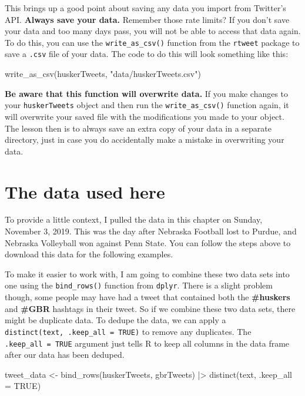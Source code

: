 \documentclass[
  letterpaper,
  DIV=11,
  numbers=noendperiod]{scrreprt}
\newenvironment{Shaded}{\begin{snugshade}}{\end{snugshade}}
\newcommand{\AttributeTok}[1]{\textcolor[rgb]{0.40,0.45,0.13}{#1}}
\newcommand{\ConstantTok}[1]{\textcolor[rgb]{0.56,0.35,0.01}{#1}}
\newcommand{\FunctionTok}[1]{\textcolor[rgb]{0.28,0.35,0.67}{#1}}
\newcommand{\NormalTok}[1]{\textcolor[rgb]{0.00,0.23,0.31}{#1}}
\newcommand{\OtherTok}[1]{\textcolor[rgb]{0.00,0.23,0.31}{#1}}
\newcommand{\SpecialCharTok}[1]{\textcolor[rgb]{0.37,0.37,0.37}{#1}}
\newcommand{\StringTok}[1]{\textcolor[rgb]{0.13,0.47,0.30}{#1}}
\begin{document}
This brings up a good point about saving any data you import from
Twitter's API. \textbf{Always save your data.} Remember those rate
limits? If you don't save your data and too many days pass, you will not
be able to access that data again. To do this, you can use the
\texttt{write\_as\_csv()} function from the \texttt{rtweet} package to
save a \texttt{.csv} file of your data. The code to do this will look
something like this:

\begin{Shaded}
\begin{Highlighting}[]
\FunctionTok{write\_as\_csv}\NormalTok{(huskerTweets, }\StringTok{"data/huskerTweets.csv"}\NormalTok{)}
\end{Highlighting}
\end{Shaded}

\textbf{Be aware that this function will overwrite data.} If you make
changes to your \texttt{huskerTweets} object and then run the
\texttt{write\_as\_csv()} function again, it will overwrite your saved
file with the modifications you made to your object. The lesson then is
to always save an extra copy of your data in a separate directory, just
in case you do accidentally make a mistake in overwriting your data.

\hypertarget{the-data-used-here}{%
\section{The data used here}\label{the-data-used-here}}

To provide a little context, I pulled the data in this chapter on
Sunday, November 3, 2019. This was the day after Nebraska Football lost
to Purdue, and Nebraska Volleyball won against Penn State. You can
follow the steps above to download this data for the following examples.

To make it easier to work with, I am going to combine these two data
sets into one using the \texttt{bind\_rows()} function from
\texttt{dplyr}. There is a slight problem though, some people may have
had a tweet that contained both the \textbf{\#huskers} and
\textbf{\#GBR} hashtags in their tweet. So if we combine these two data
sets, there might be duplicate data. To dedupe the data, we can apply a
\texttt{distinct(text,\ .keep\_all\ =\ TRUE)} to remove any duplicates.
The \texttt{.keep\_all\ =\ TRUE} argument just tells R to keep all
columns in the data frame after our data has been deduped.

\begin{Shaded}
\begin{Highlighting}[]
\NormalTok{tweet\_data }\OtherTok{\textless{}{-}} \FunctionTok{bind\_rows}\NormalTok{(huskerTweets, gbrTweets) }\SpecialCharTok{|\textgreater{}} 
  \FunctionTok{distinct}\NormalTok{(text, }\AttributeTok{.keep\_all =} \ConstantTok{TRUE}\NormalTok{)}
\end{Highlighting}
\end{Shaded}
\end{document}
